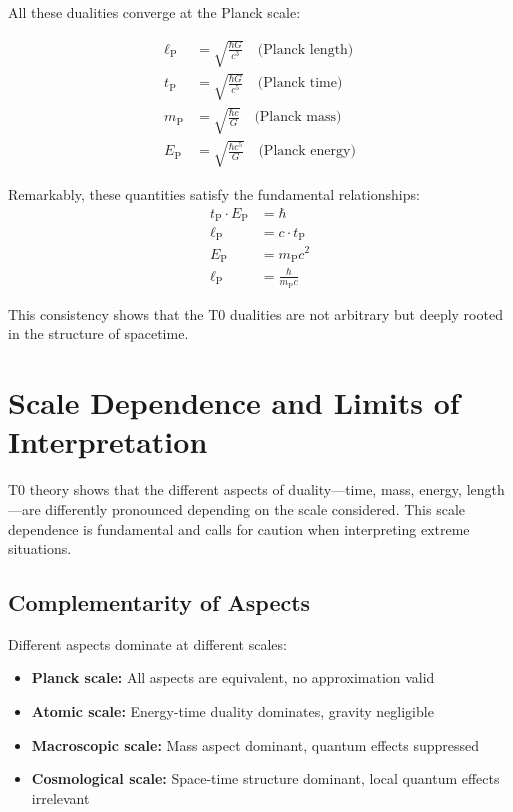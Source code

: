 \documentclass[12pt,a4paper]{article}
\newcommand{\lP}{\ell_{\text{P}}}
\newcommand{\mP}{m_{\text{P}}}
\newcommand{\EP}{E_{\text{P}}}
\newcommand{\tP}{t_{\text{P}}}
\begin{document}
	All these dualities converge at the Planck scale:
	
	\begin{align}
		\lP &= \sqrt{\frac{\hbar G}{c^3}} \quad \text{(Planck length)} \\
		\tP &= \sqrt{\frac{\hbar G}{c^5}} \quad \text{(Planck time)} \\
		\mP &= \sqrt{\frac{\hbar c}{G}} \quad \text{(Planck mass)} \\
		\EP &= \sqrt{\frac{\hbar c^5}{G}} \quad \text{(Planck energy)}
	\end{align}
	
	Remarkably, these quantities satisfy the fundamental relationships:
	\begin{align}
		\tP \cdot \EP &= \hbar \\
		\lP &= c \cdot \tP \\
		\EP &= \mP c^2 \\
		\lP &= \frac{\hbar}{\mP c}
	\end{align}
	
	This consistency shows that the T0 dualities are not arbitrary but deeply rooted in the structure of spacetime.
	
	\section{Scale Dependence and Limits of Interpretation}
	
	T0 theory shows that the different aspects of duality—time, mass, energy, length—are differently pronounced depending on the scale considered. This scale dependence is fundamental and calls for caution when interpreting extreme situations.
	
	\subsection{Complementarity of Aspects}
	
	Different aspects dominate at different scales:
	\begin{itemize}
		\item \textbf{Planck scale:} All aspects are equivalent, no approximation valid
		\item \textbf{Atomic scale:} Energy-time duality dominates, gravity negligible
		\item \textbf{Macroscopic scale:} Mass aspect dominant, quantum effects suppressed
		\item \textbf{Cosmological scale:} Space-time structure dominant, local quantum effects irrelevant
	\end{itemize}
	
\end{document}
